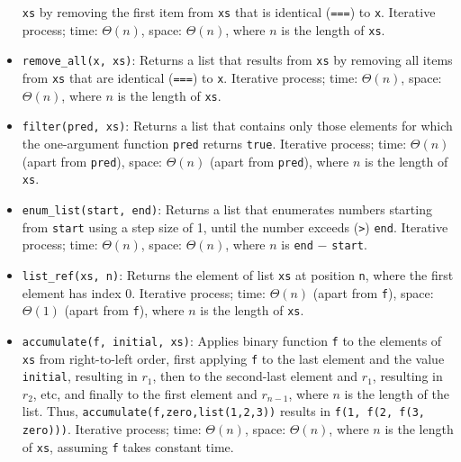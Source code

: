 \begin{itemize}
\lstinline{xs} by removing the first item from \lstinline{xs} that
is identical (\lstinline{===}) to \lstinline{x}. Iterative process;
time: $Θ(n)$, space: $Θ(n)$, where $n$ is the length of \lstinline{xs}.
\item \lstinline{remove_all(x, xs)}: Returns a list that results from
\lstinline{xs} by removing all items from \lstinline{xs} that
are identical (\lstinline{===}) to \lstinline{x}.
Iterative process;
time: $Θ(n)$, space: $Θ(n)$, where $n$ is the length of \lstinline{xs}.
\item \lstinline{filter(pred, xs)}: Returns a list that contains
only those elements for which the one-argument function
\lstinline{pred}
returns \lstinline{true}.
Iterative process;
time: $Θ(n)$ (apart from \lstinline{pred}), space: $Θ(n)$ (apart from \lstinline{pred}), where $n$ is the length of \lstinline{xs}.
\item \lstinline{enum_list(start, end)}: Returns a list that enumerates
numbers starting from \lstinline{start} using a step size of 1, until
the number exceeds (\lstinline{>}) \lstinline{end}.
Iterative process;
time: $Θ(n)$, space: $Θ(n)$, where $n$ is \lstinline{end} $-$  \lstinline{start}.
\item \lstinline{list_ref(xs, n)}: Returns the element
of list \lstinline{xs} at position \lstinline{n}, 
where the first element has index 0.
Iterative process;
time: $Θ(n)$ (apart from \lstinline{f}), space: $Θ(1)$ (apart from \lstinline{f}), where $n$ is the length of \lstinline{xs}.
\item \lstinline{accumulate(f, initial, xs)}: Applies binary
function \lstinline{f} to the elements of \lstinline{xs} from
right-to-left order, first applying \lstinline{f} to the last element
and the value \lstinline{initial}, resulting in $r_1$, then to the 
second-last element and $r_1$, resulting in $r_2$, etc, and finally
to the first element and $r_{n-1}$, where $n$ is the length of the
list. Thus, \lstinline{accumulate(f,zero,list(1,2,3))} results in
\lstinline{f(1, f(2, f(3, zero)))}.
Iterative process;
time: $Θ(n)$, space: $Θ(n)$, where $n$ is the length of \lstinline{xs},
assuming \lstinline{f} takes constant time.
\end{itemize}
